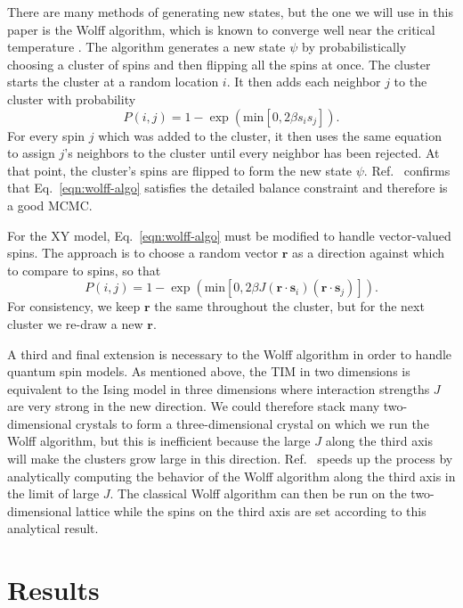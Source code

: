 \documentclass[amsmath,amssymb,aps,twocolumn]{revtex4-2}
\newcommand{\parens}[1]{\left ( #1 \right )}
\begin{document}
There are many methods of generating new states, but the one we will use in this paper is the Wolff algorithm, which is known to converge well near the critical temperature \cite{wolff1989collective}. The algorithm generates a new state $\psi$ by probabilistically choosing a cluster of spins and then flipping all the spins at once. The cluster starts the cluster at a random location $i$. It then adds each neighbor $j$ to the cluster with probability
\begin{equation}
  P(i,j) = 1 - \exp\parens{\mathrm{min}\left[0, 2\beta s_i s_j \right]}.
  \label{eqn:wolff-algo}
\end{equation}
For every spin $j$ which was added to the cluster, it then uses the same equation to assign $j$'s neighbors to the cluster until every neighbor has been rejected. At that point, the cluster's spins are flipped to form the new state $\psi$. Ref.~\cite{wolff1989collective} confirms that Eq.~\ref{eqn:wolff-algo} satisfies the detailed balance constraint and therefore is a good MCMC.

For the XY model, Eq.~\ref{eqn:wolff-algo} must be modified to handle vector-valued spins. The approach is to choose a random vector $\bm r$ as a direction against which to compare to spins, so that
\begin{equation}
  P(i,j) = 1 - \exp\parens{\mathrm{min}\left[0, 2\beta J (\bm r \cdot \bm s_i)(\bm r \cdot \bm s_j) \right]}.
\end{equation}
For consistency, we keep $\bm r$ the same throughout the cluster, but for the next cluster we re-draw a new $\bm r$.

A third and final extension is necessary to the Wolff algorithm in order to handle quantum spin models. As mentioned above, the TIM in two dimensions is equivalent to the Ising model in three dimensions where interaction strengths $J$ are very strong in the new direction. We could therefore stack many two-dimensional crystals to form a three-dimensional crystal on which we run the Wolff algorithm, but this is inefficient because the large $J$ along the third axis will make the clusters grow large in this direction. Ref.~\cite{blote2002cluster} speeds up the process by analytically computing the behavior of the Wolff algorithm along the third axis in the limit of large $J$. The classical Wolff algorithm can then be run on the two-dimensional lattice while the spins on the third axis are set according to this analytical result.

\section{Results}
\end{document}
